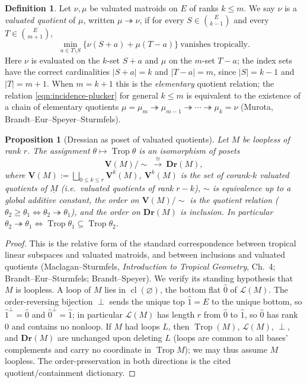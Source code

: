 \documentclass{article}
\newtheorem{proposition}[theorem]{Proposition}
\theoremstyle{definition}
\newtheorem{definition}[theorem]{Definition}
\newcommand{\cl}{\operatorname{cl}}
\newcommand{\Trop}{\operatorname{Trop}}
\newcommand{\onto}{\twoheadrightarrow}
\newcommand{\Dr}{\mathbf{Dr}}
\newcommand{\bV}{\mathbf V}
\newcommand{\cLL}{\mathcal{L}}
\begin{document}
\begin{definition}\label{def:quotient}
Let $\nu,\mu$ be valuated matroids on $E$ of ranks $k\le m$. We say $\nu$ is a \emph{valuated
quotient} of $\mu$, written $\mu\onto\nu$, if for every $S\in\binom{E}{k-1}$ and every
$T\in\binom{E}{m+1}$,
\begin{equation}\label{eqn:incidence-plucker}
  \min_{a\in T\setminus S}\bigl\{\nu(S+a)+\mu(T-a)\bigr\}\ \text{vanishes tropically.}
\end{equation}
Here $\nu$ is evaluated on the $k$-set $S+a$ and $\mu$ on the $m$-set $T-a$; the index sets have the
correct cardinalities $|S+a|=k$ and $|T-a|=m$, since $|S|=k-1$ and $|T|=m+1$. When $m=k+1$ this is
the \emph{elementary} quotient relation; the relation \eqref{eqn:incidence-plucker} for general
$k\le m$ is equivalent to the existence of a chain of elementary quotients
$\mu=\mu_m\onto\mu_{m-1}\onto\cdots\onto\mu_k=\nu$ (Murota, Brandt--Eur--Speyer--Sturmfels).
\end{definition}

\begin{proposition}[Dressian as poset of valuated quotients]\label{fact:dressian}
Let $M$ be loopless of rank $r$. The assignment $\theta\mapsto\Trop\theta$ is an isomorphism of
posets
\[
  \bV(M)/\!\sim\ \xrightarrow{\ \cong\ }\ \Dr(M),
\]
where $\bV(M):=\bigsqcup_{0\le k\le r}\bV^{k}(M)$, $\bV^{k}(M)$ is the set of corank-$k$ valuated
quotients of $\underline M$ (i.e.\ valuated quotients of rank $r-k$), $\sim$ is equivalence up to a
global additive constant, the order on $\bV(M)/\!\sim$ is the quotient relation
($\theta_2\ge\theta_1\iff\theta_2\onto\theta_1$), and the order on $\Dr(M)$ is inclusion. In
particular $\theta_2\onto\theta_1\iff\Trop\theta_1\subseteq\Trop\theta_2$.
\end{proposition}

\begin{proof}
This is the relative form of the standard correspondence between tropical linear subspaces and
valuated matroids, and between inclusions and valuated quotients (Maclagan--Sturmfels,
\emph{Introduction to Tropical Geometry}, Ch.~4; Brandt--Eur--Sturmfels; Brandt--Speyer). We verify
its standing hypothesis that $M$ is loopless. A loop of $M$ lies in $\cl(\varnothing)$, the bottom
flat $\hat0$ of $\cLL(M)$. The order-reversing bijection $\perp$ sends the unique top
$\hat1=E$ to the unique bottom, so $\hat1^{\perp}=\hat0$ and $\hat0^{\perp}=\hat1$; in particular
$\cLL(M)$ has length $r$ from $\hat0$ to $\hat1$, so $\hat0$ has rank $0$ and contains no nonloop.
If $M$ had loops $L$, then $\Trop(M)$, $\cLL(M)$, $\perp$, and $\Dr(M)$ are unchanged upon deleting
$L$ (loops are common to all bases' complements and carry no coordinate in $\Trop M$); we may thus
assume $M$ loopless. The order-preservation in both directions is the cited quotient/containment
dictionary.
\end{proof}
\end{document}
